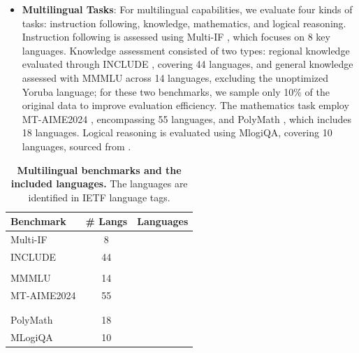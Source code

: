 \begin{itemize}
    \item \textbf{Multilingual Tasks}: For multilingual capabilities, we evaluate four kinds of tasks: instruction following, knowledge, mathematics, and logical reasoning. Instruction following is assessed using Multi-IF \citep{he2024multi}, which focuses on 8 key languages. Knowledge assessment consisted of two types: regional knowledge evaluated through INCLUDE \citep{romanou2024includeevaluatingmultilinguallanguage}, covering 44 languages, and general knowledge assessed with MMMLU \citep{mmmlu} across 14 languages, excluding the unoptimized Yoruba language; for these two benchmarks, we sample only 10\% of the original data to improve evaluation efficiency. The mathematics task employ MT-AIME2024 \citep{son2025linguisticgeneralizabilitytesttimescaling}, encompassing 55 languages, and PolyMath \citep{wang2025polymathevaluatingmathematicalreasoning}, which includes 18 languages.  Logical reasoning is evaluated using MlogiQA, covering 10 languages, sourced from \citet{pmmeval}.
\end{itemize}

\begin{table}[tbp]
\centering
\caption{\textbf{Multilingual benchmarks and the included languages.} The languages are identified in IETF language tags.}
\vspace{-1mm}
\label{tab:multilingual-benchmark}
\begin{tabular}{lcl}
\toprule
Benchmark   & \# Langs & Languages \\
\midrule
Multi-IF    & 8 &    \\
INCLUDE     & 44 &   \\
\\
MMMLU       & 14 &  \\
MT-AIME2024 & 55 &   \\
\\
\\
PolyMath    & 18 &  \\
MLogiQA     & 10 &  \\
\bottomrule
\end{tabular}
\end{table}

